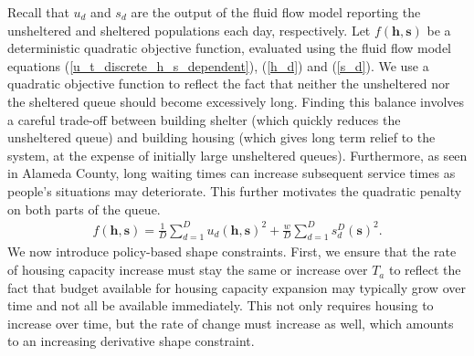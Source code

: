 \documentclass[12pt,a4paper]{article}
\begin{document}
Recall that $u_d$ and $s_d$ are the output of the fluid flow model reporting the unsheltered and sheltered populations each day, respectively.  Let $f(\boldsymbol{h},\boldsymbol{s})$ be a deterministic quadratic objective function, evaluated using the fluid flow model equations (\ref{u_t_discrete_h_s_dependent}), (\ref{h_d}) and (\ref{s_d}). We use a quadratic objective function to reflect the fact that neither the unsheltered nor the sheltered queue should become excessively long. Finding this balance involves a careful trade-off between building shelter (which quickly reduces the unsheltered queue) and building housing (which gives long term relief to the system, at the expense of initially large unsheltered queues). Furthermore, as seen in Alameda County, long waiting times can increase subsequent service times as people's situations may deteriorate. This further motivates the quadratic penalty on both parts of the queue.
%
\begin{align} \label{y}
  f(\boldsymbol{h},\boldsymbol{s}) = \frac{1}{D} \sum_{d=1}^{D} u_d(\boldsymbol{h},\boldsymbol{s})^2 + \frac{w}{D} \sum_{d=1}^{D} s^D_d(\boldsymbol{s})^2.  
\end{align}
%
We now introduce policy-based shape constraints. First, we ensure that the rate of housing capacity increase must stay the same or increase over $T_a$ to reflect the fact that budget available for housing capacity expansion may typically grow over time and not all be available immediately. This not only requires housing to increase over time, but the rate of change must increase as well, which amounts to an increasing derivative shape constraint.
\end{document}
